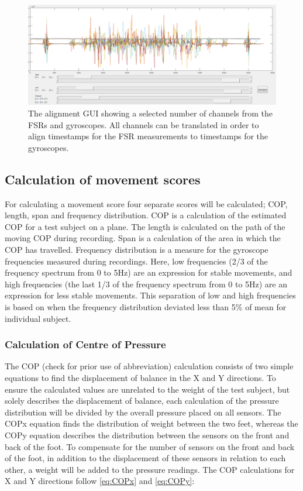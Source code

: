 \begin{figure}[H]
	\includegraphics[width=.6\textwidth]{figures/alignGUI}
	\caption{The alignment GUI showing a selected number of channels from the FSRs and gyroscopes. All channels can be translated in order to align timestamps for the FSR measurements to timestamps for the gyroscopes.}
	\label{fig:alignGUI}  %
\end{figure}


\subsection{Calculation of movement scores}

For calculating a movement score four separate scores will be calculated; COP, length, span and frequency distribution. COP is a calculation of the estimated COP for a test subject on a plane. The length is calculated on the path of the moving COP during recording. Span is a calculation of the area in which the COP has travelled. Frequency distribution is a measure for the gyroscope frequencies measured during recordings. Here, low frequencies (2/3 of the frequency spectrum from 0 to 5Hz) are an expression for stable movements, and high frequencies (the last 1/3 of the frequency spectrum from 0 to 5Hz) are an expression for less stable movements. This separation of low and high frequencies is based on when the frequency distribution deviated less than 5\% of mean for individual subject.

\subsubsection{Calculation of Centre of Pressure}
The COP (check for prior use of abbreviation) calculation consists of two simple equations to find the displacement of balance in the X and Y directions. To ensure the calculated values are unrelated to the weight of the test subject, but solely describes the displacement of balance, each calculation of the pressure distribution will be divided by the overall pressure placed on all sensors. The COP\lowercase{x} equation finds the distribution of weight between the two feet, whereas the COP\lowercase{y} equation describes the distribution between the sensors on the front and back of the foot. To compensate for the number of sensors on the front and back of the foot, in addition to the displacement of these sensors in relation to each other, a weight will be added to the pressure readings.
The COP calculations for X and Y directions follow \eqref{eq:COPx} and \eqref{eq:COPy}:

